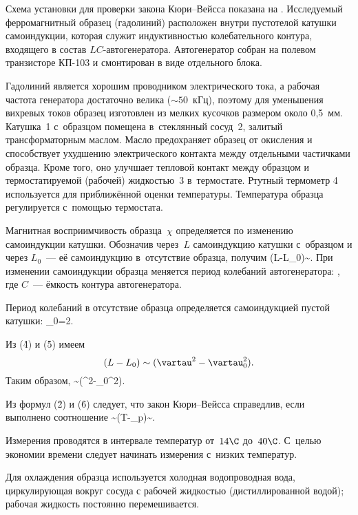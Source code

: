 \eo Схема установки для проверки закона Кюри--Вейсса показана на . Исследуемый ферромагнитный образец (гадолиний)
расположен внутри пустотелой катушки самоиндукции, которая служит индуктивностью колебательного контура, входящего в
состав $LC$-автогенератора. Автогенератор собран на полевом транзисторе КП-103 и смонтирован в виде отдельного блока.


Гадолиний является хорошим проводником электрического тока, а рабочая частота генератора достаточно велика
(${\sim}50$~кГц), поэтому для уменьшения вихревых токов образец изготовлен из мелких кусочков размером около 0,5~мм.
Катушка~1 с~образцом помещена в~стеклянный сосуд~2, залитый трансформаторным маслом. Масло предохраняет образец от
окисления и способствует ухудшению электрического контакта между отдельными частичками образца. Кроме того, оно улучшает
тепловой контакт между образцом и термостатируемой (рабочей) жидкостью~3 в~термостате. Ртутный термометр 4 используется
для приближённой оценки температуры. Температура образца регулируется с~помощью термостата.%

Магнитная восприимчивость образца~$\chi$ определяется по изменению самоиндукции катушки. Обозначив через~$L$
самоиндукцию катушки с~образцом и через $L_0$~--- её самоиндукцию в~отсутствие образца, получим
(L-L_0)\sim\chi.
\ee
При изменении самоиндукции образца меняется период колебаний автогенератора:
\pi{},
\ee
где $C$~--- ёмкость контура автогенератора.

Период колебаний в отсутствие образца определяется самоиндукцией пустой катушки:
\vartau_0=2\pi{}.
\ee

Из (\r{4}) и (\r{5}) имеем
\[
(L-L_0)\sim (\vartau^2-\vartau_0^2).
\]
Таким образом,
\chi\sim (\vartau^2-\vartau_0^2).
\ee

Из формул (\r{2}) и (\r{6}) следует, что закон Кюри--Вейсса справедлив, если выполнено соотношение
\sim(T-\Theta_p)\sim{}.
\ee

Измерения проводятся в интервале температур от~$14\C$ до~$40\C$. С~целью экономии времени следует начинать измерения
с~низких температур.

Для охлаждения образца используется холодная водопроводная вода, циркулирующая вокруг сосуда с рабочей жидкостью
(дистиллированной водой); рабочая жидкость постоянно перемешивается.

